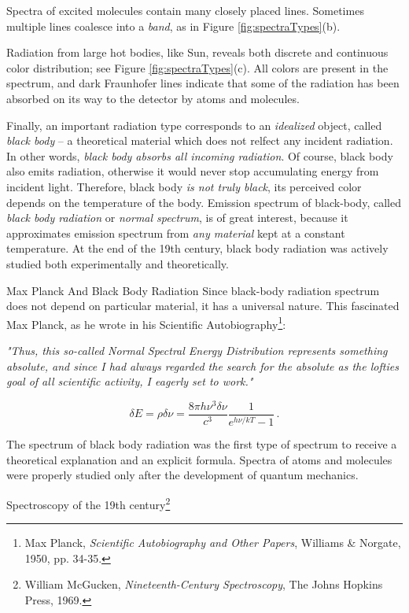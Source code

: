 Spectra of excited molecules contain many closely placed lines. Sometimes multiple lines coalesce into a \emph{band}, as in Figure \ref{fig:spectraTypes}(b).

Radiation from large hot bodies, like Sun, reveals both discrete and continuous color distribution; see Figure \ref{fig:spectraTypes}(c). All colors are present in the spectrum, and dark Fraunhofer lines indicate that some of the radiation has been absorbed on its way to the detector by atoms and molecules.

Finally, an important radiation type corresponds to an \emph{idealized} object, called \emph{black body} -- a theoretical material which does not relfect any incident radiation. In other words, \emph{black body absorbs all incoming radiation}. Of course, black body also emits radiation, otherwise it would never stop accumulating energy from incident light. Therefore, black body \emph{is not truly black}, its perceived color depends on the temperature of the body. Emission spectrum of black-body, called \emph{black body radiation} or \emph{normal spectrum}, is of great interest, because it approximates emission spectrum from \emph{any material} kept at a constant temperature.
At the end of the 19th century, black body radiation was actively studied both experimentally and theoretically. 

\begin{mybio}{Max Planck And Black Body Radiation}
	Since black-body radiation spectrum does not depend on particular material, it has a universal nature. This fascinated Max Planck, as he wrote in his Scientific Autobiography\footnote{Max Planck, \emph{Scientific Autobiography and Other Papers}, Williams \& Norgate, 1950, pp. 34-35.}:
	
	\emph{"Thus, this so-called Normal Spectral Energy Distribution represents something absolute, and since I had always regarded the search for the absolute as the lofties goal of all scientific activity, I eagerly set to work."}
	
	\[
	\delta E = \rho\delta \nu = \frac{8\pi h\nu^3\delta\nu}{c^3}\frac{1}{e^{h\nu/kT}-1}\,.
	\]
\end{mybio}

The spectrum of black body radiation was the first type of spectrum to receive a theoretical explanation and an explicit formula. Spectra of atoms and molecules were properly studied only after the development of quantum mechanics.

Spectroscopy of the 19th century\footnote{William McGucken, \emph{Nineteenth-Century Spectroscopy}, The Johns Hopkins Press, 1969.}

